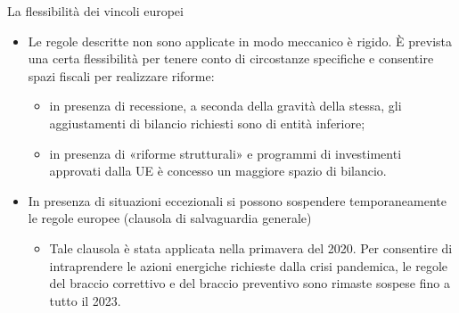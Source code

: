 \documentclass[aspectratio=64,11pt]{beamer}
\begin{document}
\begin{frame}{La flessibilità dei vincoli europei}

  \begin{itemize}
  \item Le regole descritte non sono applicate in modo meccanico è rigido. È
    prevista una certa flessibilità per tenere conto di circostanze specifiche
    e consentire spazi fiscali per realizzare riforme:
    \begin{itemize}
    \item in presenza di recessione, a seconda della gravità della stessa, gli
      aggiustamenti di bilancio richiesti sono di entità inferiore;
    \item in presenza di «riforme strutturali» e programmi di investimenti
      approvati dalla UE è concesso un maggiore spazio di bilancio.
    \end{itemize}
  \item In presenza di situazioni eccezionali si possono sospendere
    temporaneamente le regole europee (\alert{clausola di salvaguardia
      generale})
    \begin{itemize}
    \item Tale clausola è stata applicata nella primavera del 2020. Per
      consentire di intraprendere le azioni energiche richieste dalla crisi
      pandemica, le regole del braccio correttivo e del braccio preventivo
      sono rimaste sospese fino a tutto il 2023.
    \end{itemize}
  \end{itemize}
\end{frame}
\end{document}
